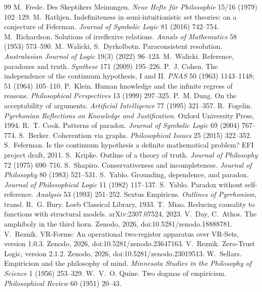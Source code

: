 \documentclass[11pt,a4paper]{article}
\begin{document}
\begin{thebibliography}{99}
 M.~Frede. Des Skeptikers Meinungen. \emph{Neue Hefte für Philosophie} 15/16 (1979) 102--129.
 M.~Rathjen. Indefiniteness in semi-intuitionistic set theories: on a conjecture of Feferman. \emph{Journal of Symbolic Logic} 81 (2016) 742--754.
 M.~Richardson. Solutions of irreflexive relations. \emph{Annals of Mathematics} 58 (1953) 573--590.
 M.~Walicki, S.~Dyrkolbotn. Paraconsistent resolution. \emph{Australasian Journal of Logic} 19(3)
  (2022) 96--123.
 M.~Walicki. Reference, paradoxes and truth. \emph{Synthese} 171 (2009) 195--226.
 P.~J. Cohen. The independence of the continuum hypothesis, I and II. \emph{PNAS} 50 (1963)
  1143--1148; 51 (1964) 105--110.
 P.~Klein. Human knowledge and the infinite regress of reasons. \emph{Philosophical Perspectives} 13
  (1999) 297--325.
 P.~M. Dung. On the acceptability of arguments. \emph{Artificial Intelligence} 77 (1995) 321--357.
 R.~Fogelin. \emph{Pyrrhonian Reflections on Knowledge and Justification}. Oxford University Press,
  1994.
 R.~T. Cook. Patterns of paradox. \emph{Journal of Symbolic Logic} 69 (2004) 767--774.
 S.~Berker. Coherentism via graphs. \emph{Philosophical Issues} 25 (2015) 322--352.
 S.~Feferman. Is the continuum hypothesis a definite mathematical problem? EFI project draft, 2011.
 S.~Kripke. Outline of a theory of truth. \emph{Journal of Philosophy} 72 (1975) 690--716.
 S.~Shapiro. Conservativeness and incompleteness. \emph{Journal of Philosophy} 80 (1983) 521--531.
 S.~Yablo. Grounding, dependence, and paradox. \emph{Journal of Philosophical Logic} 11 (1982) 117--137.
 S.~Yablo. Paradox without self-reference. \emph{Analysis} 53 (1993) 251--252.
 Sextus Empiricus. \emph{Outlines of Pyrrhonism}, transl. R.~G. Bury. Loeb Classical Library, 1933.
 T.~Miao. Reducing causality to functions with structural models. arXiv:2307.07524, 2023.
 V.~Day, C.~Athos. The amphiboly in the third horn. Zenodo, 2026, doi:10.5281/zenodo.18888781.
 V.~Reznik. VR-Forms: An operational two-register apparatus over VR-Sets, version 1.0.3.
  Zenodo, 2026, doi:10.5281/zenodo.23647163.
 V.~Reznik. Zero-Trust Logic, version 2.1.2. Zenodo, 2026, doi:10.5281/zenodo.23019513.
 W.~Sellars. Empiricism and the philosophy of mind. \emph{Minnesota Studies in the Philosophy of
  Science} 1 (1956) 253--329.
 W.~V.~O. Quine. Two dogmas of empiricism. \emph{Philosophical Review} 60 (1951) 20--43.
\end{thebibliography}
\end{document}

